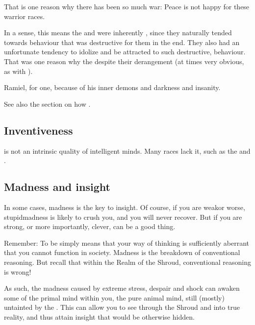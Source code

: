 That is one reason why there has been so much war:
Peace is not happy for these warrior races.

In a sense, this means the \resphain and \dragons were inherently , since they naturally tended towards behaviour that was destructive for them in the end.
They also had an unfortunate tendency to idolize and be attracted to such destructive,  behaviour.
That was one reason why the  despite their derangement (at times very obvious, as with \Zachirah). 

Ramiel, for one,  because of his inner demons and darkness and insanity.

See also the section on how . 









\subsection{Inventiveness}
 is not an intrinsic quality of intelligent minds. 
Many races lack it, such as the  and . 








\subsection{Madness and insight}
In some cases, madness is the key to insight. Of course, if you are weak\dash or worse, stupid\dash madness is likely to crush you, and you will never recover. But if you are strong, or more importantly, clever,  can be a good thing.

Remember: To be  simply means that your way of thinking is sufficiently aberrant that you cannot function in society. Madness is the breakdown of conventional reasoning. But recall that within the Realm of the Shroud, conventional reasoning is wrong! 

As such, the madness caused by extreme stress, despair and shock can awaken some of the primal mind within you, the pure animal mind, still (mostly) untainted by the . This can allow you to see through the Shroud and into true reality, and thus attain insight that would be otherwise hidden. 

